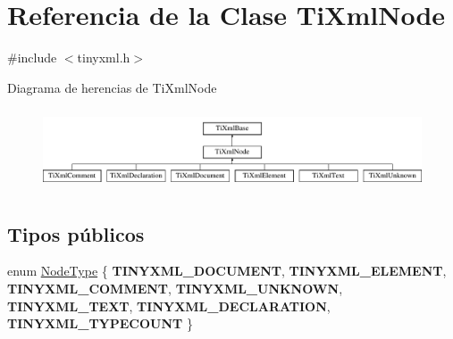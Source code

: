 \hypertarget{classTiXmlNode}{\section{\-Referencia de la \-Clase \-Ti\-Xml\-Node}
\label{classTiXmlNode}
}


{\ttfamily \#include $<$tinyxml.\-h$>$}

\-Diagrama de herencias de \-Ti\-Xml\-Node\begin{figure}[H]
\begin{center}
\leavevmode
\includegraphics[height=2.413793cm]{classTiXmlNode}
\end{center}
\end{figure}
\subsection*{\-Tipos públicos}
\begin{DoxyCompactItemize}
\item 
enum \hyperlink{classTiXmlNode_a836eded4920ab9e9ef28496f48cd95a2}{\-Node\-Type} \{ \*
{\bfseries \-T\-I\-N\-Y\-X\-M\-L\-\_\-\-D\-O\-C\-U\-M\-E\-N\-T}, 
{\bfseries \-T\-I\-N\-Y\-X\-M\-L\-\_\-\-E\-L\-E\-M\-E\-N\-T}, 
{\bfseries \-T\-I\-N\-Y\-X\-M\-L\-\_\-\-C\-O\-M\-M\-E\-N\-T}, 
{\bfseries \-T\-I\-N\-Y\-X\-M\-L\-\_\-\-U\-N\-K\-N\-O\-W\-N}, 
\*
{\bfseries \-T\-I\-N\-Y\-X\-M\-L\-\_\-\-T\-E\-X\-T}, 
{\bfseries \-T\-I\-N\-Y\-X\-M\-L\-\_\-\-D\-E\-C\-L\-A\-R\-A\-T\-I\-O\-N}, 
{\bfseries \-T\-I\-N\-Y\-X\-M\-L\-\_\-\-T\-Y\-P\-E\-C\-O\-U\-N\-T}
 \}
\end{DoxyCompactItemize}
